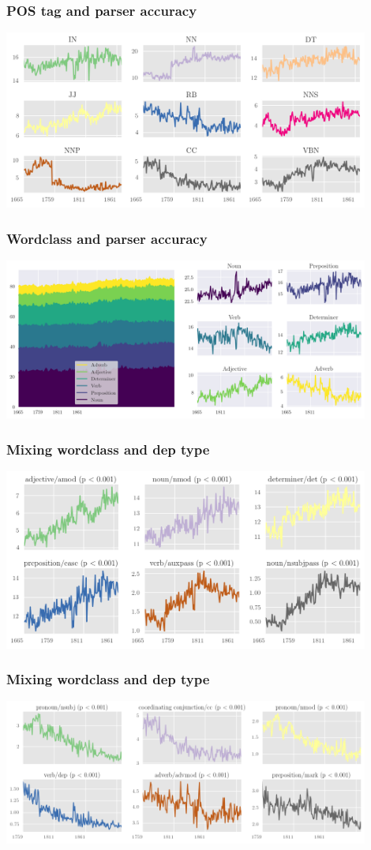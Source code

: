 \documentclass{beamer}       %
\begin{document}
\begin{frame}
    \frametitle{POS tag and parser accuracy}
    \centering
    \includegraphics[width=0.90\textwidth]{../images/postag}
\end{frame}

\begin{frame}
    \frametitle{Wordclass and parser accuracy}
    \centering
    \includegraphics[width=0.90\textwidth]{../images/multi-wc}
\end{frame}

\begin{frame}
    \frametitle{Mixing wordclass and dep type}
    \centering
    \includegraphics[width=0.90\textwidth]{../images/6-inc}
\end{frame}

\begin{frame}
    \frametitle{Mixing wordclass and dep type}
    \centering
    \includegraphics[width=0.90\textwidth]{../images/6-dec}
\end{frame}
\end{document}
